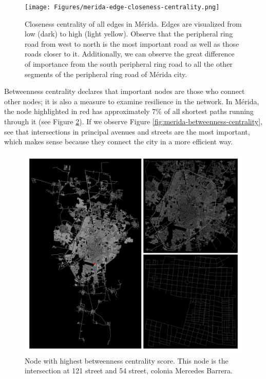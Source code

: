 \begin{figure}[htpb]
  \centering
  \texttt{[image: Figures/merida-edge-closeness-centrality.png]}
  \caption{Closeness centrality of all edges in Mérida. Edges are visualized from low (dark) to high (light yellow). Observe that the peripheral ring road from west to north is the most important road as well as those roads closer to it. Additionally, we can observe the great difference of importance from the south peripheral ring road to all the other segments of the peripheral ring road of Mérida city.
    \label{fig:merida-edge-closeness-centrality}}
\end{figure}

Betweenness centrality declares that important nodes are those who connect other nodes; it is also a measure to examine resilience in the network. In Mérida, the node highlighted in red has approximately 7\% of all shortest paths running through it (see Figure \ref{fig:merida-max-node-betweenness-centrality}). If we observe Figure \ref{fig:merida-betweenness-centrality}, see that intersections in principal avenues and streets are the most important, which makes sense because they connect the city in a more efficient way.

\begin{figure}[htpb]
  \centering
  \includegraphics[width=1.0\textwidth]{Figures/merida-node-betweenness-centrality.png}
  \caption{Node with highest betweenness centrality score. This node is the intersection at 121 street and 54 street, colonia Mercedes Barrera.
    \label{fig:merida-max-node-betweenness-centrality}}
\end{figure}

